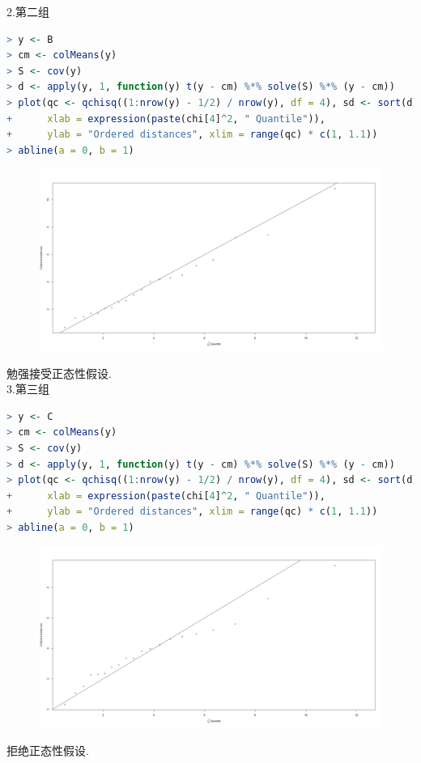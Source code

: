 \documentclass[11pt,a4paper]{ctexart}
\begin{document}
2.第二组

\begin{lstlisting}[language=r]
> y <- B
> cm <- colMeans(y)
> S <- cov(y)
> d <- apply(y, 1, function(y) t(y - cm) %*% solve(S) %*% (y - cm))
> plot(qc <- qchisq((1:nrow(y) - 1/2) / nrow(y), df = 4), sd <- sort(d),
+      xlab = expression(paste(chi[4]^2, " Quantile")),
+      ylab = "Ordered distances", xlim = range(qc) * c(1, 1.1))
> abline(a = 0, b = 1)
\end{lstlisting}
\begin{figure}[H]
	\centering
	\includegraphics[width=\textwidth]{11.png}
\end{figure}
勉强接受正态性假设.\\

3.第三组

\begin{lstlisting}[language=r]
> y <- C
> cm <- colMeans(y)
> S <- cov(y)
> d <- apply(y, 1, function(y) t(y - cm) %*% solve(S) %*% (y - cm))
> plot(qc <- qchisq((1:nrow(y) - 1/2) / nrow(y), df = 4), sd <- sort(d),
+      xlab = expression(paste(chi[4]^2, " Quantile")),
+      ylab = "Ordered distances", xlim = range(qc) * c(1, 1.1))
> abline(a = 0, b = 1)
\end{lstlisting}
\begin{figure}[H]
	\centering
	\includegraphics[width=\textwidth]{12.png}
\end{figure}
拒绝正态性假设.
\end{document}
